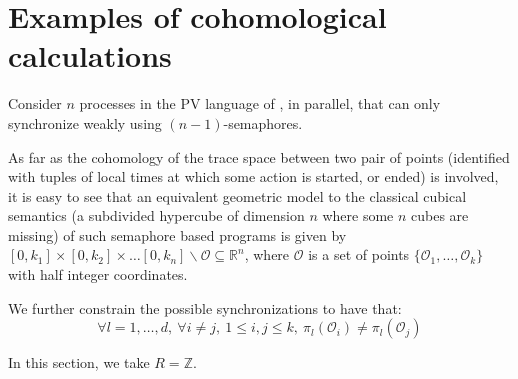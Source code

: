 \documentclass{article}
\def\R{\mbox{$\mathbb{R}$}}
\def\Z{\mbox{$\mathbb{Z}$}}
\begin{document}
\section{Examples of cohomological calculations}

\label{sec:examples}


Consider $n$ processes in the PV language of \cite{thebook}, in parallel, that can only synchronize weakly using $(n-1)$-semaphores. 


As far as the cohomology of the trace space between two pair of points (identified with tuples of local times at which some action is started, or ended) is involved, it is easy to see that an equivalent geometric model to the classical cubical semantics (a subdivided hypercube of dimension $n$ where some $n$ cubes are missing) of such semaphore based programs \cite{book} is given by $[0,k_1]\times [0,k_2]\times \ldots [0,k_n] \backslash \mathcal{O} \subseteq \R^n$, where $\mathcal{O}$ is a set of points $\{\mathcal{O}_1,\ldots,\mathcal{O}_k\}$ with half integer coordinates. 

We further constrain the possible synchronizations to have that: 
$$
\forall l=1,\ldots,d, \ \forall i\neq j, \ 1 \leq i, j \leq k, \ \pi_l(\mathcal{O}_i)\neq \pi_l(\mathcal{O}_j) 
$$

In this section, we take $R=\Z$. 
\end{document}
